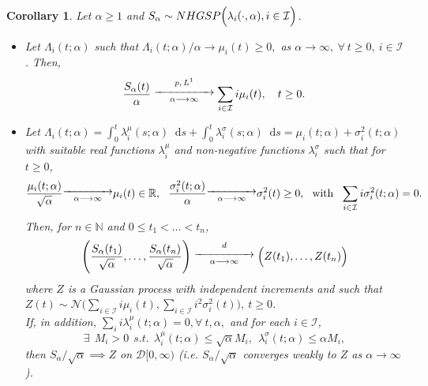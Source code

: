 \documentclass[12pt, twoside, english, headsepline]{article}
\newcommand*\dif{\mathop{}\!\mathrm{d}}  %
\newtheorem{corollary} {Corollary}[section] %
\theoremstyle{definition} %
\numberwithin{equation}{section} %
\begin{document}
\begin{corollary}\label{corollarioConvergenzaSkellamProcessoGaussiano}
Let $\alpha\ge1$ and $S_\alpha\sim NHGSP \Bigl(\lambda_i(\cdot, \alpha),i\in\mathcal{I}\Bigr)$.
\begin{itemize}
\item[($i$)] Let $\Lambda_i(t;\alpha)$ such that $\Lambda_i(t;\alpha) /\alpha\longrightarrow \mu_i(t)\ge0,$ as $\alpha\longrightarrow \infty, \ \forall\ t\ge0, \ i\in\mathcal{I}$. Then,
\begin{equation}
\frac{S_\alpha(t)}{\alpha}\stackrel{p,\,L^1}{ \substack{\xrightarrow{\hspace*{1.7cm}}\\\alpha\longrightarrow\infty}} \sum_{i\in\mathcal{I}}i \mu_i(t), \ \ \ t\ge0.
\end{equation}

\item[($ii$)] Let $\Lambda_i(t;\alpha) = \int_0^t \lambda_i^{\mu}(s;\alpha)\dif s  +\int_0^t\lambda_i^{\sigma}(s;\alpha)\dif s = \mu_i(t;\alpha) +\sigma^2_i(t;\alpha)$ with suitable real functions $ \lambda_i^{\mu}$ and non-negative functions $\lambda_i^{\sigma}$ such that for $t\ge0$,
\begin{equation*}
\frac{\mu_i(t;\alpha)}{\sqrt{\alpha}}\substack{\xrightarrow{\hspace*{1.4cm}}\\\alpha\longrightarrow\infty} \mu_i(t)\in\mathbb{R}, \ \ \frac{\sigma_i^2(t;\alpha)}{\alpha}\substack{\xrightarrow{\hspace*{1.4cm}}\\\alpha\longrightarrow\infty} \sigma_i^2(t)\ge0,\ \text{ with }\  \sum_{i\in\mathcal{I}} i \sigma^2_i (t;\alpha) = 0.
\end{equation*}
Then, for $n\in\mathbb{N}$ and $0\le t_1<\dots< t_n$,
\begin{equation}\label{convergenzaFinitoDimensionaliSkellamLimiteKac}
\Biggl(\frac{S_\alpha(t_1)}{\sqrt{\alpha}}, \dots, \frac{S_\alpha(t_n)}{\sqrt{\alpha}}\Biggr)\stackrel{d}{ \substack{\xrightarrow{\hspace*{1.7cm}}\\\alpha\longrightarrow\infty}} \Bigl(Z(t_1),\dots,Z(t_n)\Bigr)
\end{equation}
where $Z$ is a Gaussian process with independent increments and such that $Z(t)\sim\mathcal{N}\biggl( \sum_{i\in\mathcal{I}}i \mu_i(t), \sum_{i\in\mathcal{I}} i^2 \sigma_i^2(t)\biggr), \ t\ge0$.
\\
If, in addition, $\sum_i i \lambda^\mu_i(t;\alpha) =0, \forall \ t,\alpha,$ and for each $i\in\mathcal{I}$,
\begin{equation}\label{ipotesiConvergenzaDeboleAProcessoGaussiano}
\exists \ \ M_i>0\ \ s.t.\ \ \lambda_i^\mu(t;\alpha)\le\sqrt{\alpha}M_i, \ \ \lambda_i^\sigma(t;\alpha)\le\alpha M_i,
\end{equation}
then $S_\alpha/\sqrt{\alpha} \implies Z$ on $\mathcal{D}[0,\infty)$ (i.e. $S_\alpha/\sqrt{\alpha}$ converges weakly to $Z$ as $\alpha\rightarrow \infty$).
\end{itemize}
\end{corollary}
\end{document}
